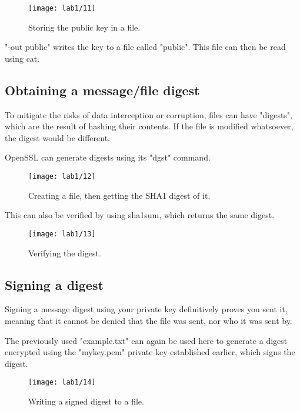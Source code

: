 \begin{figure}[H]
    \centering
    \texttt{[image: lab1/11]}
    \caption{Storing the public key in a file.}
    \label{fig:pubKeyFile}
\end{figure}

\noindent "-out public" writes the key to a file called "public".
This file can then be read using cat.

\pagebreak

\subsection{Obtaining a message/file digest}\label{subsec:hashDigest}
To mitigate the risks of data interception or corruption, files can have "digests", which are the result
of hashing their contents.
If the file is modified whatsoever, the digest would be different.\newline

OpenSSL can generate digests using its "dgst" command.
\begin{figure}[H]
    \centering
    \texttt{[image: lab1/12]}
    \caption{Creating a file, then getting the SHA1 digest of it.}
    \label{fig:digest}
\end{figure}

This can also be verified by using sha1sum, which returns the same digest.

\begin{figure}[H]
    \centering
    \texttt{[image: lab1/13]}
    \caption{Verifying the digest.}
    \label{fig:digestVerify}
\end{figure}

\pagebreak

\subsection{Signing a digest}\label{subsec:SignDigest}
Signing a message digest using your private key definitively proves you sent it,
meaning that it cannot be denied that the file was sent, nor who it was sent by.

The previously used "example.txt" can again be used here to generate a digest encrypted using the "mykey.pem"
private key established earlier, which signs the digest.

\begin{figure}[H]
    \centering
    \texttt{[image: lab1/14]}
    \caption{Writing a signed digest to a file.}
    \label{fig:writeDigest}
\end{figure}

